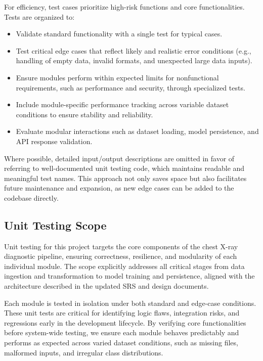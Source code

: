 \documentclass[12pt, titlepage]{article}
\begin{document}
For efficiency, test cases prioritize high-risk functions and core functionalities. Tests are organized to:
\begin{itemize}
  \item Validate standard functionality with a single test for typical cases.
  \item Test critical edge cases that reflect likely and realistic error conditions (e.g., handling of empty data, invalid formats, and unexpected large data inputs).
  \item Ensure modules perform within expected limits for nonfunctional requirements, such as performance and security, through specialized tests.
  \item Include module-specific performance tracking across variable dataset conditions to ensure stability and reliability.
  \item Evaluate modular interactions such as dataset loading, model persistence, and API response validation.
\end{itemize}

Where possible, detailed input/output descriptions are omitted in favor of referring to well-documented unit testing code, which maintains readable and meaningful test names. This approach not only saves space but also facilitates future maintenance and expansion, as new edge cases can be added to the codebase directly.



\subsection{Unit Testing Scope}


Unit testing for this project targets the core components of the chest X-ray diagnostic pipeline, ensuring correctness, resilience, and modularity of each individual module. The scope explicitly addresses all critical stages from data ingestion and transformation to model training and persistence, aligned with the architecture described in the updated SRS and design documents.

Each module is tested in isolation under both standard and edge-case conditions. These unit tests are critical for identifying logic flaws, integration risks, and regressions early in the development lifecycle. By verifying core functionalities before system-wide testing, we ensure each module behaves predictably and performs as expected across varied dataset conditions, such as missing files, malformed inputs, and irregular class distributions.
\end{document}

